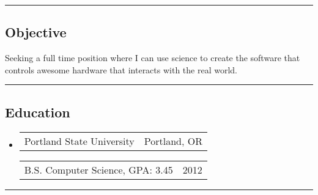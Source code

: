 \documentclass[10pt,letterpaper]{article}
\author{Eric Dinger}
\makeatletter
\newcommand{\heading}[2]
{\begin{tabular*}{\linewidth}{l@{\extracolsep{\fill}}r}
#1 &
#2 \\
\end{tabular*}}
\makeatother
\begin{document}
 \renewcommand*\arraystretch{1.5}


\hrule
\vspace{-.4em}

\subsection*{Objective}
Seeking a full time position where I can use science to create the software that controls awesome hardware that interacts with the real world.\\
\vspace{.4em}
\hrule
\vspace{-.2em}

\subsection*{Education}
	\begin{itemize}
	\item
		\heading
			{Portland State University}
			{Portland, OR}

		\vspace{-1em}
		\heading 
			{ B.S. Computer Science, GPA: 3.45}
			{2012}
	\end{itemize}

\hrule
\end{document}
